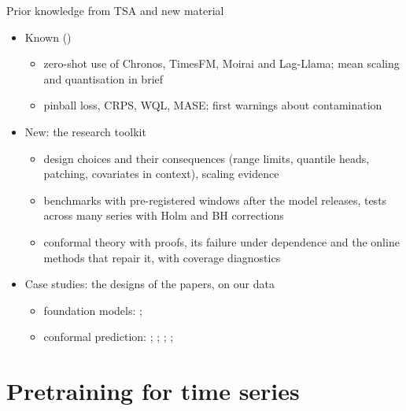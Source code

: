 \begin{frame}{Prior knowledge from TSA and new material}
\itemsize{\small}
\begin{itemize}
    \item \hypertarget{c13known}{}Known ()
    \begin{itemize}
        \item zero-shot use of Chronos, TimesFM, Moirai and Lag-Llama; mean scaling and quantisation in brief
        \item pinball loss, CRPS, WQL, MASE; first warnings about contamination
    \end{itemize}
    \item New: the research toolkit
    \begin{itemize}
        \item design choices and their consequences (range limits, quantile heads, patching, covariates in context), scaling evidence
        \item benchmarks with pre-registered windows after the model releases, tests across many series with Holm and BH corrections
        \item conformal theory with proofs, its failure under dependence and the online methods that repair it, with coverage diagnostics
    \end{itemize}
    \item Case studies: the designs of the papers, on our data
    \begin{itemize}
        \item foundation models: ; 
        \item conformal prediction: ; ; ; ; 
    \end{itemize}
\end{itemize}
\end{frame}


\section{Pretraining for time series}

